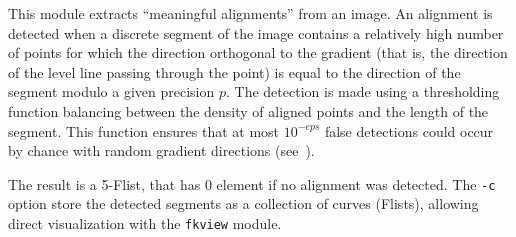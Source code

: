 This module extracts ``meaningful alignments'' from an image.
An alignment is detected when a discrete segment of the image
contains a relatively high number of points for which the
direction orthogonal to the gradient (that is, the direction 
of the level line passing through the point) is equal to the direction
of the segment modulo a given precision $p$. The detection is made
using a thresholding function balancing between the density of
aligned points and the length of the segment. This function ensures
that at most $10^{-eps}$ false detections could occur by chance
with random gradient directions (see~\cite{desolneux.moisan.ea:meaningful}).

\medskip

The result is a 5-Flist, that has 0 element if no alignment was detected.
The \verb+-c+ option store the detected segments as a collection of curves
(Flists), allowing direct visualization with the \verb+fkview+ module.
